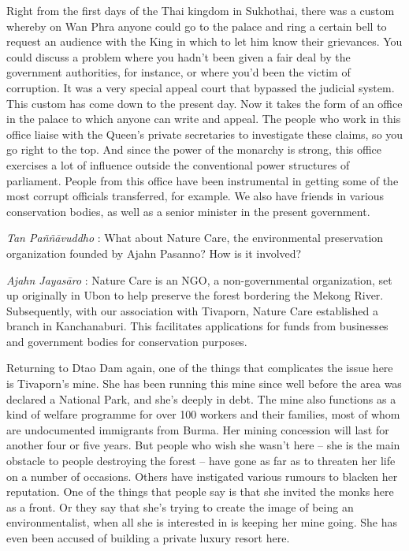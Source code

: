 Right from the first days of the Thai kingdom in Sukhothai, there was a
custom whereby on Wan Phra anyone could go to the palace and ring a
certain bell to request an audience with the King in which to let him
know their grievances. You could discuss a problem where you hadn't been
given a fair deal by the government authorities, for instance, or where
you'd been the victim of corruption. It was a very special appeal court
that bypassed the judicial system. This custom has come down to the
present day. Now it takes the form of an office in the palace to which
anyone can write and appeal. The people who work in this office liaise
with the Queen's private secretaries to investigate these claims, so you
go right to the top. And since the power of the monarchy is strong, this
office exercises a lot of influence outside the conventional power
structures of parliament. People from this office have been instrumental
in getting some of the most corrupt officials transferred, for example.
We also have friends in various conservation bodies, as well as a senior
minister in the present government.

\emph{Tan Paññāvuddho} : What about Nature Care, the environmental
preservation organization founded by Ajahn Pasanno? How is it involved?

\emph{Ajahn Jayasāro }: Nature Care is an NGO, a non-governmental
organization, set up originally in Ubon to help preserve the forest
bordering the Mekong River. Subsequently, with our association with
Tivaporn, Nature Care established a branch in Kanchanaburi. This
facilitates applications for funds from businesses and government bodies
for conservation purposes.

Returning to Dtao Dam again, one of the things that complicates the
issue here is Tivaporn's mine. She has been running this mine since well
before the area was declared a National Park, and she's deeply in debt.
The mine also functions as a kind of welfare programme for over 100
workers and their families, most of whom are undocumented immigrants
from Burma. Her mining concession will last for another four or five
years. But people who wish she wasn't here -- she is the main obstacle
to people destroying the forest -- have gone as far as to threaten her
life on a number of occasions. Others have instigated various rumours to
blacken her reputation. One of the things that people say is that she
invited the monks here as a front. Or they say that she's trying to
create the image of being an environmentalist, when all she is
interested in is keeping her mine going. She has even been accused of
building a private luxury resort here.


